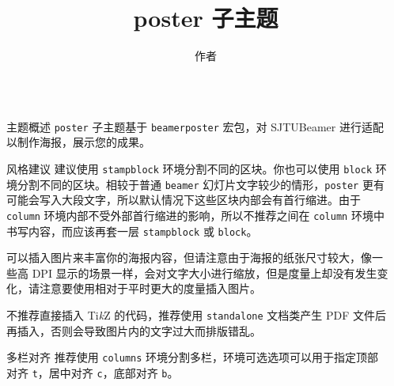 \documentclass{ctexbeamer}
\begin{document}
  \title{poster 子主题}
  \author{作者}
  \logo{\zhlogo}
  \begin{frame}[fragile]
    \begin{columns}[T]
      \begin{column}{.45\textwidth}

        \begin{stampblock}{主题概述}
          \texttt{poster} 子主题基于 \texttt{beamerposter} 宏包\cite{beamerposter}，对 SJTUBeamer 进行适配以制作海报，展示您的成果。
        \end{stampblock}

        \begin{stampblock}{风格建议}
          建议使用 \texttt{stampblock} 环境分割不同的区块。你也可以使用 \texttt{block} 环境分割不同的区块。相较于普通 \texttt{beamer} 幻灯片文字较少的情形，\texttt{poster} 更有可能会写入大段文字，所以默认情况下这些区块内部会有首行缩进。由于 \texttt{column} 环境内部不受外部首行缩进的影响，所以不推荐之间在 \texttt{column} 环境中书写内容，而应该再套一层 \texttt{stampblock} 或 \texttt{block}。
          
          可以插入图片来丰富你的海报内容，但请注意由于海报的纸张尺寸较大，像一些高 DPI 显示的场景一样，会对文字大小进行缩放，但是度量上却没有发生变化，请注意要使用相对于平时更大的度量插入图片。

          不推荐直接插入 Ti\emph{k}Z 的代码，推荐使用 \texttt{standalone} 文档类产生 PDF 文件后再插入，否则会导致图片内的文字过大而排版错乱。
        \end{stampblock}

        \begin{stampblock}{多栏对齐}
          推荐使用 \texttt{columns} 环境分割多栏，环境可选选项可以用于指定顶部对齐 \texttt{t}，居中对齐 \texttt{c}，底部对齐 \texttt{b}。
        \end{stampblock}

      \end{column}
      \begin{column}{.45\textwidth}


\end{column}
\end{columns}
\end{frame}
\end{document}
